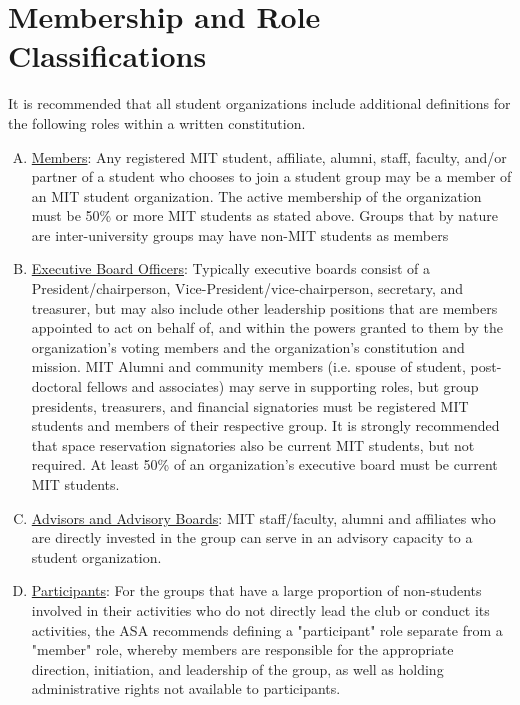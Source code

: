 \documentclass[12pt]{article}
\begin{document}
\section{Membership and Role Classifications}
\label{art:I_sect3}
It is recommended that all student organizations include additional definitions for the following roles
within a written constitution.
\begin{enumerate}[A.]
    \item \ul{Members}: Any registered MIT student, affiliate, alumni, staff, faculty, and/or partner of a student
who chooses to join a student group may be a member of an MIT student organization. The
active membership of the organization must be 50\% or more MIT students as stated above.
Groups that by nature are inter-university groups may have non-MIT students as members

    \item \ul{Executive Board Officers}: Typically executive boards consist of a President/chairperson,
Vice-President/vice-chairperson, secretary, and treasurer, but may also include other
leadership positions that are members appointed to act on behalf of, and within the powers
granted to them by the organization’s voting members and the organization’s constitution and
mission. MIT Alumni and community members (i.e. spouse of student, post-doctoral fellows
and associates) may serve in supporting roles, but group presidents, treasurers, and financial
signatories must be registered MIT students and members of their respective group. It is
strongly recommended that space reservation signatories also be current MIT students, but
not required. At least 50\% of an organization’s executive board must be current MIT students.

    \item \ul{Advisors and Advisory Boards}: MIT staff/faculty, alumni and affiliates who are directly invested in
the group can serve in an advisory capacity to a student organization.

    \item \ul{Participants}: For the groups that have a large proportion of non-students involved in their
activities who do not directly lead the club or conduct its activities, the ASA recommends
defining a "participant" role separate from a "member" role, whereby members are responsible
for the appropriate direction, initiation, and leadership of the group, as well as holding
administrative rights not available to participants.
\end{enumerate}
\end{document}
